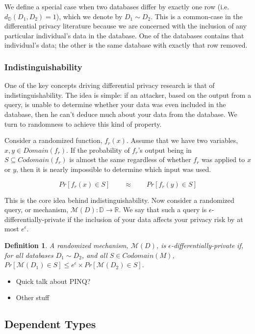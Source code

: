 \documentclass[12pt]{article}
\newtheorem{defn}{Definition}[section]
\begin{document}
We define a special case when two databases differ by exactly one row (i.e. $d_\mathbb{D}(D_1,D_2)=1$), which we denote by $D_1 \sim D_2$.
This is a common-case in the differential privacy literature because we are concerned with the inclusion of any particular individual's data in the database.
One of the databases contains that individual's data; the other is the same database with exactly that row removed.

\subsubsection{Indistinguishability}

One of the key concepts driving differential privacy research is that of indistinguishability.
The idea is simple: if an attacker, based on the output from a query, is unable to determine whether your data was even included in the database, then he can't deduce much about your data from the database.
We turn to randomness to achieve this kind of property.

Consider a randomized function, $f_r(x)$.
Assume that we have two variables, $x, y \in Domain(f_r)$.
If the probability of $f_r$'s output being in $S \subseteq Codomain(f_r)$ is almost the same regardless of whether $f_r$ was applied to $x$ or $y$, then it is nearly impossible to determine which input was used.

\[
  Pr[f_r(x)\in S] \qquad\approx\qquad  Pr[f_r(y)\in S]
\]

This is the core idea behind indistinguishability.
Now consider a randomized query, or mechanism, $\mathcal{M}(D) : \mathbb{D} \rightarrow \mathbb{R}$.
We say that such a query is $\epsilon$-differentially-private if the inclusion of your data affects your privacy risk by at most $e^\epsilon$.

\begin{defn}
  A randomized mechanism, $\mathcal{M}(D)$, is $\epsilon$-differentially-private if, for all databases $D_1 \sim D_2$, and all $S \in Codomain(M)$,
  $Pr[\mathcal{M}(D_1)\in S] \le e^\epsilon \times Pr[\mathcal{M}(D_2)\in S]$.
\end{defn}

\begin{itemize}
  \item Quick talk about PINQ?
  \item Other stuff
\end{itemize}

\subsection{Dependent Types}
\end{document}
